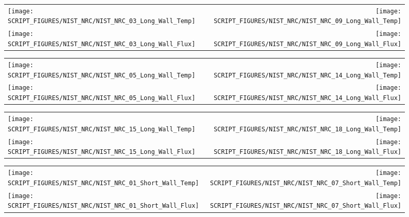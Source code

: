 \clearpage

\begin{figure}[!ht]
\begin{tabular*}{\textwidth}{l@{\extracolsep{\fill}}r}
\texttt{[image: SCRIPT\_FIGURES/NIST\_NRC/NIST\_NRC\_03\_Long\_Wall\_Temp]} &
\texttt{[image: SCRIPT\_FIGURES/NIST\_NRC/NIST\_NRC\_09\_Long\_Wall\_Temp]} \\
\texttt{[image: SCRIPT\_FIGURES/NIST\_NRC/NIST\_NRC\_03\_Long\_Wall\_Flux]} &
\texttt{[image: SCRIPT\_FIGURES/NIST\_NRC/NIST\_NRC\_09\_Long\_Wall\_Flux]}
\end{tabular*}
\label{NIST_NRCLong_Wall_3_and_9}
\end{figure}

\begin{figure}[!ht]
\begin{tabular*}{\textwidth}{l@{\extracolsep{\fill}}r}
\texttt{[image: SCRIPT\_FIGURES/NIST\_NRC/NIST\_NRC\_05\_Long\_Wall\_Temp]} &
\texttt{[image: SCRIPT\_FIGURES/NIST\_NRC/NIST\_NRC\_14\_Long\_Wall\_Temp]} \\
\texttt{[image: SCRIPT\_FIGURES/NIST\_NRC/NIST\_NRC\_05\_Long\_Wall\_Flux]} &
\texttt{[image: SCRIPT\_FIGURES/NIST\_NRC/NIST\_NRC\_14\_Long\_Wall\_Flux]}
\end{tabular*}
\label{NIST_NRCLong_Wall_5_and_14}
\end{figure}

\clearpage

\begin{figure}[!ht]
\begin{tabular*}{\textwidth}{l@{\extracolsep{\fill}}r}
\texttt{[image: SCRIPT\_FIGURES/NIST\_NRC/NIST\_NRC\_15\_Long\_Wall\_Temp]} &
\texttt{[image: SCRIPT\_FIGURES/NIST\_NRC/NIST\_NRC\_18\_Long\_Wall\_Temp]} \\
\texttt{[image: SCRIPT\_FIGURES/NIST\_NRC/NIST\_NRC\_15\_Long\_Wall\_Flux]} &
\texttt{[image: SCRIPT\_FIGURES/NIST\_NRC/NIST\_NRC\_18\_Long\_Wall\_Flux]}
\end{tabular*}
\label{NIST_NRCLong_Wall_15_and_18}
\end{figure}

\clearpage

\begin{figure}[!ht]
\begin{tabular*}{\textwidth}{l@{\extracolsep{\fill}}r}
\texttt{[image: SCRIPT\_FIGURES/NIST\_NRC/NIST\_NRC\_01\_Short\_Wall\_Temp]} &
\texttt{[image: SCRIPT\_FIGURES/NIST\_NRC/NIST\_NRC\_07\_Short\_Wall\_Temp]} \\
\texttt{[image: SCRIPT\_FIGURES/NIST\_NRC/NIST\_NRC\_01\_Short\_Wall\_Flux]} &
\texttt{[image: SCRIPT\_FIGURES/NIST\_NRC/NIST\_NRC\_07\_Short\_Wall\_Flux]}
\end{tabular*}
\label{NIST_NRCShort_Wall_1_and_7}
\end{figure}

